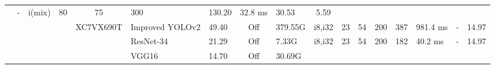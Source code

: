 \documentclass{article}
\begin{document}
\begin{table}
\begin{adjustbox}{totalheight=\baselineskip,}
\begin{tabular}{ccccclp{2em}cp{3em}cp{2em}p{4em}p{3em}p{3.5em}p{3.5em}p{2.5em}p{3em}}
                               &\multirow{1}{*}{-}
                                   &\multirow{1}{*}{i(mix)}
                                       &\multirow{1}{*}{80}
                                           &\multirow{1}{*}{75}
                                               &\multirow{1}{*}{300}
                                                   &\multirow{1}{*}{130.20}
                                                       &\multirow{1}{*}{32.8 ms}
                                                           &\multirow{1}{*}{30.53}
                                                               &\multirow{1}{*}{5.59}\\
\cmidrule{4-17}
   &   &   &\multirow{3}{*}{\cite{niAlgorithmHardwareCoOptimization2023}}
               &\multirow{3}{*}{XC7VX690T}
                   &\multirow{1}{*}{Improved YOLOv2}
                       &\multirow{1}{*}{49.40}
                           &\multirow{1}{*}{Off}
                               &\multirow{1}{*}{379.55G}
                                   &\multirow{1}{*}{i8,i32}
                                       &\multirow{1}{*}{23}
                                           &\multirow{1}{*}{54}
                                               &\multirow{1}{*}{200}
                                                   &\multirow{1}{*}{387}
                                                       &\multirow{1}{*}{981.4 ms}
                                                           &\multirow{1}{*}{-}
                                                               &\multirow{1}{*}{14.97}\\
   &   &   &   &   &\multirow{1}{*}{ResNet-34}
                       &\multirow{1}{*}{21.29}
                           &\multirow{1}{*}{Off}
                               &\multirow{1}{*}{7.33G}
                                   &\multirow{1}{*}{i8,i32}
                                       &\multirow{1}{*}{23}
                                           &\multirow{1}{*}{54}
                                               &\multirow{1}{*}{200}
                                                   &\multirow{1}{*}{182}
                                                       &\multirow{1}{*}{40.2 ms}
                                                           &\multirow{1}{*}{-}
                                                               &\multirow{1}{*}{14.97}\\
   &   &   &   &   &\multirow{1}{*}{VGG16}
                       &\multirow{1}{*}{14.70}
                           &\multirow{1}{*}{Off}
                               &\multirow{1}{*}{30.69G}

\end{tabular}
\end{adjustbox}
\end{table}
\end{document}
